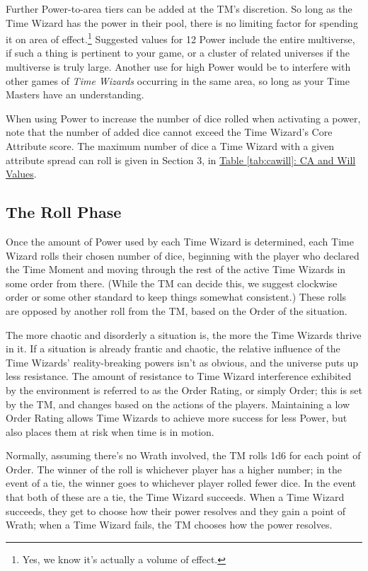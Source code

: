 \documentclass{article}
\newcommand{\tw}{\emph{Time Wizards}}
\begin{document}
Further Power-to-area tiers can be added at the TM's discretion. So long as the Time Wizard has
the power in their pool, there is no limiting factor for spending it on area of
effect.\footnote{Yes, we know it's actually a volume of effect.} Suggested values for 12 Power
include the entire multiverse, if such a thing is pertinent to your game, or a cluster of
related universes if the multiverse is truly large. Another use for high Power would be to
interfere with other games of \tw{} occurring in the same area, so long as your Time Masters
have an understanding.

When using Power to increase the number of dice rolled when activating a power, note that the
number of added dice cannot exceed the Time Wizard's Core Attribute score. The maximum number
of dice a Time Wizard with a given attribute spread can roll is given in Section 3, in
\hyperref[tab:cawill]{Table \ref*{tab:cawill}: CA and Will Values}.

\subsection{The Roll Phase} \label{ssec:roll-phase}
Once the amount of Power used by each Time Wizard is determined, each Time Wizard rolls their
chosen number of dice, beginning with the player who declared the Time Moment and moving through
the rest of the active Time Wizards in some order from there. (While the TM can decide this, we
suggest clockwise order or some other standard to keep things somewhat consistent.) These rolls
are opposed by another roll from the TM, based on the Order of the situation.

The more chaotic and disorderly a situation is, the more the Time Wizards thrive in it. If a
situation is already frantic and chaotic, the relative influence of the Time Wizards'
reality-breaking powers isn't as obvious, and the universe puts up less resistance. The amount
of resistance to Time Wizard interference exhibited by the environment is referred to as the
Order Rating, or simply Order; this is set by the TM, and changes based on the actions of the
players. Maintaining a low Order Rating allows Time Wizards to achieve more success for less
Power, but also places them at risk when time is in motion.

Normally, assuming there's no Wrath involved, the TM rolls 1d6 for each point of Order. The
winner of the roll is whichever player has a higher number; in the event of a tie, the winner
goes to whichever player rolled fewer dice. In the event that both of these are a tie, the
Time Wizard succeeds. When a Time Wizard succeeds, they get to choose how their power resolves
and they gain a point of Wrath; when a Time Wizard fails, the TM chooses how the power resolves.
\end{document}

